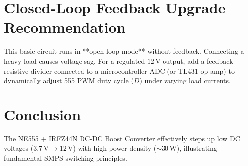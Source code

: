 \documentclass[11pt,a4paper]{article}
\begin{document}
\section{Closed-Loop Feedback Upgrade Recommendation}
This basic circuit runs in **open-loop mode** without feedback. Connecting a heavy load causes voltage sag. For a regulated $12\,\text{V}$ output, add a feedback resistive divider connected to a microcontroller ADC (or TL431 op-amp) to dynamically adjust 555 PWM duty cycle ($D$) under varying load currents.

\section{Conclusion}
The NE555 + IRFZ44N DC-DC Boost Converter effectively steps up low DC voltages ($3.7\,\text{V} \rightarrow 12\,\text{V}$) with high power density ($\sim 30\,\text{W}$), illustrating fundamental SMPS switching principles.
\end{document}
